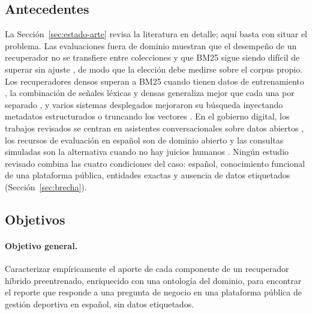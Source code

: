 \documentclass[11pt,letterpaper]{article}
\numberwithin{equation}{section}
\begin{document}
\subsection{Antecedentes}
\label{sec:antecedentes}
La Sección~\ref{sec:estado-arte} revisa la literatura en detalle; aquí basta con situar el problema. Las evaluaciones fuera de dominio muestran que el desempeño de un recuperador no se transfiere entre colecciones y que BM25 sigue siendo difícil de superar sin ajuste \cite{thakur2021beir}, de modo que la elección debe medirse sobre el corpus propio. Los recuperadores densos superan a BM25 cuando tienen datos de entrenamiento \cite{karpukhin2020dpr}, la combinación de señales léxicas y densas generaliza mejor que cada una por separado \cite{luan2021sparse,chen2022hybrid}, y varios sistemas desplegados mejoraron su búsqueda inyectando metadatos estructurados o truncando los vectores \cite{baumgart2026eclass,ling2026ubereats,kothari2026flipkart}. En el gobierno digital, los trabajos revisados se centran en asistentes conversacionales sobre datos abiertos \cite{cantador2021chatbot,cortescediel2023chatbots}, los recursos de evaluación en español son de dominio abierto \cite{zhang2023miracl,bonifacio2021mmarco,valentini2025messirve} y las consultas simuladas son la alternativa cuando no hay juicios humanos \cite{azzopardi2007simulated}. Ningún estudio revisado combina las cuatro condiciones del caso: español, conocimiento funcional de una plataforma pública, entidades exactas y ausencia de datos etiquetados (Sección~\ref{sec:brecha}).

\subsection{Objetivos}
\label{sec:objetivos}
\paragraph{Objetivo general.} Caracterizar empíricamente el aporte de cada componente de un recuperador híbrido preentrenado, enriquecido con una ontología del dominio, para encontrar el reporte que responde a una pregunta de negocio en una plataforma pública de gestión deportiva en español, sin datos etiquetados.
\end{document}

